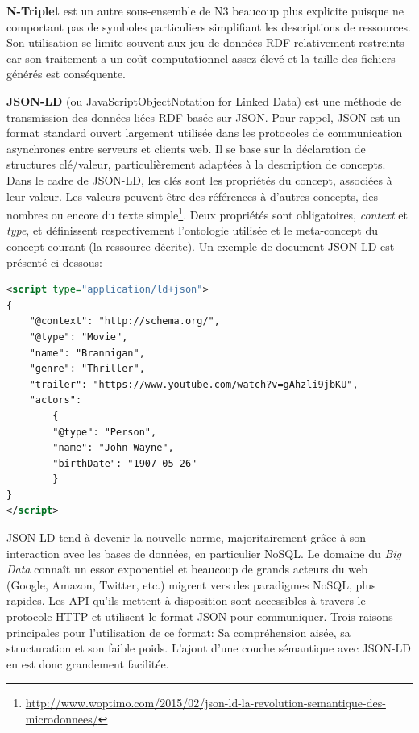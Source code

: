 \textbf{N-Triplet} est un autre sous-ensemble de N3 beaucoup plus explicite puisque ne comportant pas de symboles particuliers simplifiant les descriptions de ressources. Son utilisation se limite souvent aux jeu de données RDF relativement restreints car son traitement a un coût computationnel assez élevé et la taille des fichiers générés est conséquente.

\textbf{JSON-LD} (ou JavaScriptObjectNotation for Linked Data) est une méthode de transmission des données liées RDF basée sur JSON. Pour rappel, JSON est un format standard ouvert largement utilisée dans les protocoles de communication asynchrones entre serveurs et clients web. Il se base sur la déclaration de structures clé/valeur, particulièrement adaptées à la description de concepts. 
Dans le cadre de JSON-LD, les clés sont les propriétés du concept, associées à leur valeur. Les valeurs peuvent être des références à d’autres concepts, des nombres ou encore du texte simple\footnote{\url{http://www.woptimo.com/2015/02/json-ld-la-revolution-semantique-des-microdonnees/}}. Deux propriétés sont obligatoires, \textit{context} et \textit{type}, et définissent respectivement l'ontologie utilisée et le meta-concept du concept courant (la ressource décrite). Un exemple de document JSON-LD est présenté ci-dessous:

\begin{lstlisting}[language=XML]
<script type="application/ld+json">
{
	"@context": "http://schema.org/",
	"@type": "Movie",
	"name": "Brannigan",
	"genre": "Thriller",
	"trailer": "https://www.youtube.com/watch?v=gAhzli9jbKU",
	"actors":
		{
		"@type": "Person",
		"name": "John Wayne",
		"birthDate": "1907-05-26"
		}
}
</script>
\end{lstlisting}

JSON-LD tend à devenir la nouvelle norme, majoritairement grâce à son interaction avec les bases de données, en particulier NoSQL. Le domaine du \textit{Big Data} connaît un essor exponentiel et beaucoup de grands acteurs du web (Google, Amazon, Twitter, etc.) migrent vers des paradigmes NoSQL, plus rapides. Les API qu'ils mettent à disposition sont accessibles à travers le protocole HTTP et utilisent le format JSON pour communiquer. Trois raisons principales pour l'utilisation de ce format: Sa compréhension aisée, sa structuration et son faible poids. L'ajout d'une couche sémantique avec JSON-LD en est donc grandement facilitée. 

